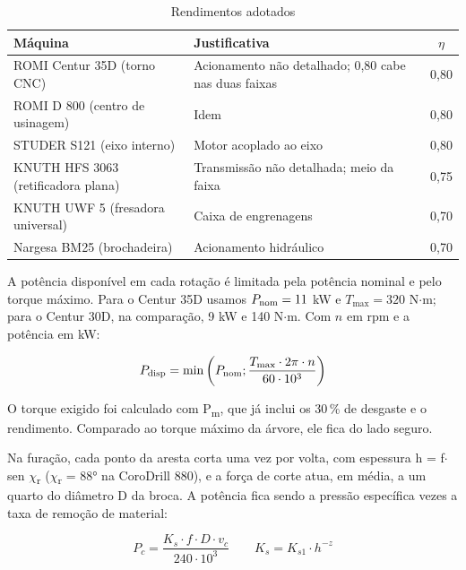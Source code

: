 \begin{table}[H]
\centering
\caption{Rendimentos adotados}\label{tab:eta}
{\small\renewcommand{\arraystretch}{1.2}
\begin{tabular}{|l|>{\raggedright\arraybackslash}p{6.2cm}|c|}
\hline
\rowcolor{cinza} \textbf{Máquina} & \textbf{Justificativa} & \textbf{$\eta$} \\ \hline
ROMI Centur 35D (torno CNC) & Acionamento não detalhado; 0,80 cabe nas duas faixas & 0,80 \\ \hline
ROMI D 800 (centro de usinagem) & Idem & 0,80 \\ \hline
STUDER S121 (eixo interno) & Motor acoplado ao eixo & 0,80 \\ \hline
KNUTH HFS 3063 (retificadora plana) & Transmissão não detalhada; meio da faixa & 0,75 \\ \hline
KNUTH UWF 5 (fresadora universal) & Caixa de engrenagens & 0,70 \\ \hline
Nargesa BM25 (brochadeira) & Acionamento hidráulico & 0,70 \\ \hline
\end{tabular}}
\end{table}

A potência disponível em cada rotação é limitada pela potência nominal e pelo torque máximo. Para o Centur 35D usamos $P_{\rm nom}=11$ kW e $T_{\max}=320$ N$\cdot$m; para o Centur 30D, na comparação, 9 kW e 140 N$\cdot$m. Com $n$ em rpm e a potência em kW:

\begin{equation}\label{eq:pdisp}
  P_{\text{disp}} = \min \left( P_{\rm nom}; \frac{T_{\max} \cdot 2 \pi \cdot n}{60 \cdot 10^{3}} \right)
\end{equation}

O torque exigido foi calculado com P\textsubscript{m}, que já inclui os 30\,\% de desgaste e o rendimento. Comparado ao torque máximo da árvore, ele fica do lado seguro.

Na furação, cada ponto da aresta corta uma vez por volta, com espessura h = f$\cdot$sen $\chi$\textsubscript{r} ($\chi$\textsubscript{r} = 88° na CoroDrill 880), e a força de corte atua, em média, a um quarto do diâmetro D da broca. A potência fica sendo a pressão específica vezes a taxa de remoção de material:

\begin{equation}\label{eq:pfur}
  P_{c} = \frac{K_{s} \cdot f \cdot D \cdot v_{c}}{240 \cdot 10^{3}} \qquad K_{s} = K_{s1} \cdot h^{-z}
\end{equation}

